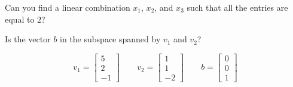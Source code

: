 \documentclass[11pt]{article}
\begin{document}
\vspace{1.5in}

Can you find a linear combination $x_1$, $x_2$, and $x_3$ such that all the entries are equal to $2$?

\vspace{2.5in}

Is the vector $b$ in the subspace spanned by $v_1$ and $v_2$?

\begin{displaymath}
v_1 = \left[ \begin{array}{r} 5 \\ 2 \\ -1 \end{array}\right]
\quad\quad
v_2 = \left[ \begin{array}{r} 1 \\ 1 \\ -2 \end{array}\right]
\quad\quad
b = \left[ \begin{array}{r} 0 \\ 0 \\ 1 \end{array}\right]
\end{displaymath}

\vspace{4in}
\end{document}
